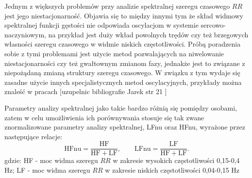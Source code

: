 Jednym z większych problemów przy analizie spektralnej szeregu czasowego $RR$ jest jego
niestacjonarność. Objawia się to między innymi tym że skład widmowy spektralnej funkcji
gęstości nie odpowiada oscylacjom w systemie sercowo-naczyniowym, na przykład jest duży
wkład powolnych trędów czy też brzegowych własności szeregu czasowego w widmie niskich
częstotliwości. Próbą poradzenia sobie z tymi problemami jest użycie metod pozwalających
na niwelowanie niestacjonarności czy też gwałtownym zmianom fazy, jednakże jest to związane
z niepożądaną zmianą struktury szeregu czasowego. W związku z tym wydaje się zasadne użycie
innych specjalistycznych metod oscylacyjnych, przykłady można znaleść w pracach [uzupelnic bibliografie Jarek str 21 ]     
 
Parametry analizy spektralnej jako takie bardzo różnią się pomiędzy osobami, zatem w celu
umożliwienia ich porównywania stosuje się tak zwane znormalizowane parametry analizy
spektralnej, LFnu oraz HFnu, wyrażone przez następujące relacje:
\begin{equation}
\mathrm{HFnu=\frac{HF}{HF+LF}},\qquad \mathrm{LFnu=\frac{LF}{HF+LF}}. \label{HFLFnu}
\end{equation}
gdzie: HF - moc widma szeregu $RR$ w zakresie wysokich częstotliwości 0,15-0,4 Hz;
LF - moc widma szeregu $RR$ w zakresie niskich częstotliwości 0,04-0,15 Hz



